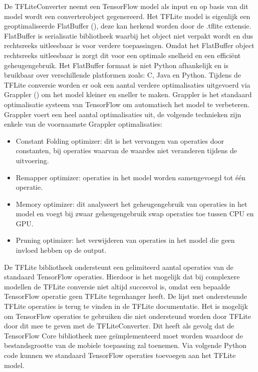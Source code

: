 De TFLiteConverter neemt een TensorFlow model als input en op basis van dit model wordt een converterobject gegenereerd.
Het TFLite model is eigenlijk een geoptimaliseerde FlatBuffer (\cite{Google_flatbuffers_2014}), deze kan herkend worden door de .tflite extensie.
FlatBuffer is serialisatie bibliotheek waarbij het object niet verpakt wordt en dus rechtsreeks uitleesbaar is voor verdere toepassingen.
Omdat het FlatBuffer object rechtsreeks uitleesbaar is zorgt dit voor een optimale snelheid en een effici\"ent geheugengebruik.
Het FlatBuffer formaat is niet Python afhankelijk en is bruikbaar over verschillende platformen zoals: C, Java en Python.
Tijdens de TFLite conversie worden er ook een aantal verdere optimalisaties uitgevoerd via Grappler (\cite{tensorflow2015-whitepaper}) om het model kleiner en sneller te maken.
Grappler is het standaard optimalisatie systeem van TensorFlow om automatisch het model te verbeteren.
Grappler voert een heel aantal optimalisaties uit, de volgende technieken zijn enkele van de voornaamste Grappler optimalisaties: 

\begin{itemize}
	\item Constant Folding optimizer: dit is het vervangen van operaties door constanten, bij operaties waarvan de waardes niet veranderen tijdens de uitvoering.  
	\item Remapper optimizer: operaties in het model worden samengevoegd tot \'e\'en operatie.
	\item Memory optimizer: dit analyseert het geheugengebruik van operaties in het model en voegt bij zwaar geheugengebruik swap operaties toe tussen CPU en GPU.
	\item Pruning optimizer: het verwijderen van operaties in het model die geen invloed hebben op de output.
\end{itemize}

De TFLite bibliotheek ondersteunt een gelimiteerd aantal operaties van de standaard TensorFlow operaties.
Hierdoor is het mogelijk dat bij complexere modellen de TFLite conversie niet altijd succesvol is, omdat een bepaalde TensorFlow operatie geen TFLite tegenhanger heeft.
De lijst met ondersteunde TFLite operaties is terug te vinden in de TFLite documentatie.
Het is mogelijk om TensorFlow operaties te gebruiken die niet ondersteund worden door TFLite door dit mee te geven met de TFLiteConverter.
Dit heeft als gevolg dat de TensorFlow Core bibliotheek mee ge\"implementeerd moet worden waardoor de bestandsgrootte van de mobiele toepassing zal toenemen.
Via volgende Python code kunnen we standaard TensorFlow operaties toevoegen aan het TFLite model.

